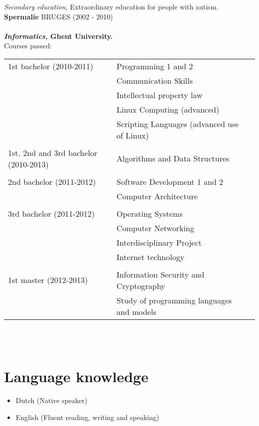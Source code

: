 \documentclass[margin, 10pt]{res} %
\begin{document}
\begin{resume}
{\sl Secondary education,} Extraordinary education for people with autism.\\
\textbf{Spermalie} BRUGES (2002 - 2010)
\\ \\
\textbf{{\sl Informatics,} Ghent University.\\}
Courses passed:\\
\begin{tabular}{l l l}
1st bachelor (2010-2011) & Programming 1 and 2 \\
                         & Communication Skills \\
                         & Intellectual property law \\
                         & Linux Computing (advanced) \\
                         & Scripting Languages (advanced use of Linux) \\
\\
1st, 2nd and 3rd bachelor (2010-2013) & Algorithms and Data Structures \\
\\
2nd bachelor (2011-2012) & Software Development 1 and 2 \\
                         & Computer Architecture \\
\\
3rd bachelor (2011-2012) & Operating Systems \\
                         & Computer Networking \\
                         & Interdisciplinary Project \\
                         & Internet technology \\
\\
1st master (2012-2013) & Information Security and Cryptography \\
                       & Study of programming languages and models \\
\end{tabular}
\\ \\
\section{Language knowledge}
\begin{itemize}
\item[] Dutch (Native speaker)
\item[] English (Fluent reading, writing and speaking)
\end{itemize}
 

\end{resume}
\end{document}
